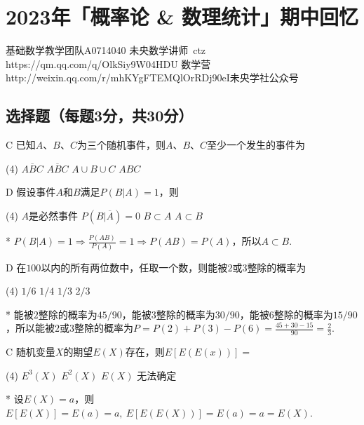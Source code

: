 \chapter{2023年「概率论 \& 数理统计」期中回忆}

\date{2023年12月3日}{基础数学教学团队}{A0714040}
{未央数学讲师~ctz}
{https://qm.qq.com/q/OlkSiy9W04}{HDU 数学营}
{http://weixin.qq.com/r/mhKYgFTEMQlOrRDj90eI}{未央学社公众号}

\section{选择题（每题3分，共30分）}
\begin{choice}{C}
    已知$A$、$B$、$C$为三个随机事件，则$A$、$B$、$C$至少一个发生的事件为
\begin{tasks}(4)
    \task $\overline{ABC}$
    \task $\overline{ABC}$
    \task $A\cup B\cup C$
    \task $ABC$
\end{tasks}
\end{choice}

\begin{choice}{D}
    假设事件$A$和$B$满足$P(B|A)=1$，则
\begin{tasks}(4)
    \task $A$是必然事件
    \task $P(B|\overline{A})=0$
    \task $B\subset A$
    \task $A\subset B$
\end{tasks}
\end{choice}
\begin{solution}*
    $P(B|A)=1\Rightarrow\frac{P(AB)}{P(A)}=1\Rightarrow P(AB)=P(A)$，所以$A\subset B$. 
\end{solution}

\begin{choice}{D}
    在$100$以内的所有两位数中，任取一个数，则能被$2$或$3$整除的概率为
\begin{tasks}(4)
    \task $1/6$
    \task $1/4$
    \task $1/3$
    \task $2/3$
\end{tasks}
\end{choice}
\begin{solution}*
    能被$2$整除的概率为$45/90$，能被$3$整除的概率为$30/90$，能被$6$整除的概率为$15/90$，所以能被$2$或$3$整除的概率为$P=P(2)+P(3)-P(6)=\frac{45+30-15}{90}=\frac23$.
\end{solution}

\begin{choice}{C}
    随机变量$X$的期望$E(X)$存在，则$E[E(E(x))]=$
\begin{tasks}(4)
    \task $E^3(X)$
    \task $E^2(X)$
    \task $E(X)$
    \task 无法确定
\end{tasks}
\end{choice}
\begin{solution}*
    设$E(X)=a$，则$E[E(X)]=E(a)=a,\ E[E(E(X))]=E(a)=a=E(X)$. 
\end{solution}


